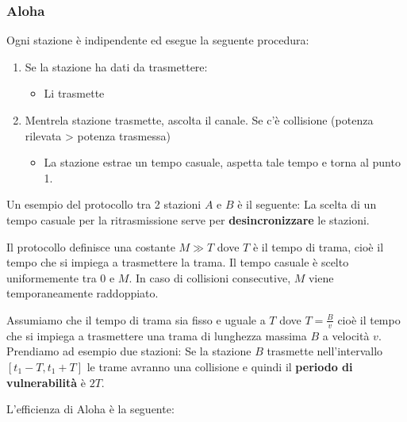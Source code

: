 \documentclass[a4paper]{article}
\begin{document}
\subsubsection{Aloha}
Ogni stazione è indipendente ed esegue la seguente procedura:
\begin{enumerate}
  \item Se la stazione ha dati da trasmettere:
    \begin{itemize}
      \item Li trasmette
    \end{itemize}

  \item Mentrela stazione trasmette, ascolta il canale. 
    Se c'è collisione (potenza rilevata > potenza trasmessa)
    \begin{itemize}
      \item La stazione estrae un tempo casuale, aspetta tale tempo e torna
        al punto 1.
    \end{itemize}
\end{enumerate}

\begin{example}
  Un esempio del protocollo tra 2 stazioni \( A \) e \( B \) è il seguente:
  \label{03-12-D2}
  \noindent
  La scelta di un tempo casuale per la ritrasmissione serve per \textbf{desincronizzare}
  le stazioni.

\end{example}
Il protocollo definisce una costante \( M \gg T \) dove \( T \) è il tempo di trama,
cioè il tempo che si impiega a trasmettere la trama. Il tempo casuale è scelto 
uniformemente tra 0 e \( M \). In caso di collisioni consecutive, \( M \) viene
temporaneamente raddoppiato.

\vspace{1em}
\noindent
Assumiamo che il tempo di trama sia fisso e uguale a \( T \) dove \( T = \frac{B}{v} \)
cioè il tempo che si impiega a trasmettere una trama di lunghezza massima \( B \) a velocità
\( v \).
Prendiamo ad esempio due stazioni:
\label{04-12-D1}
Se la stazione \( B \) trasmette nell'intervallo \( [t_1 - T,t_1 + T] \) 
le trame avranno una collisione e quindi il \textbf{periodo di vulnerabilità} è \( 2T \).

\vspace{1em}
\noindent
L'efficienza di Aloha è la seguente:
\label{04-12-D2}
\end{document}
